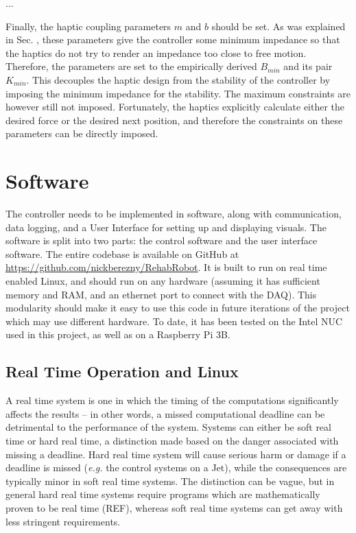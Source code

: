 \documentclass[12pt]{report}
\begin{document}
	...
	
	Finally, the haptic coupling parameters $m$ and $b$ should be set. As was explained in Sec. , these parameters give the controller some minimum impedance so that the haptics do not try to render an impedance too close to free motion. Therefore, the parameters are set to the empirically derived $B_{min}$ and its pair $K_{min}$. This decouples the haptic design from the stability of the controller by imposing the minimum impedance for the stability. The maximum constraints are however still not imposed. Fortunately, the haptics explicitly calculate either the desired force or the desired next position, and therefore the constraints on these parameters can be directly imposed. 
		

	
			
	\section{Software}	

	The controller needs to be implemented in software, along with communication, data logging, and a User Interface for setting up and displaying visuals. The software is split into two parts: the control software and the user interface software. The entire codebase is available on GitHub at \href{https://github.com/nickberezny/RehabRobot}{https://github.com/nickberezny/RehabRobot}. It is built to run on real time enabled Linux, and should run on any hardware (assuming it has sufficient memory and RAM, and an ethernet port to connect with the DAQ). This modularity should make it easy to use this code in future iterations of the project which may use different hardware. To date, it has been tested on the Intel NUC used in this project, as well as on a Raspberry Pi 3B. 
	

	

	\subsection{Real Time Operation and Linux}
	
%

A real time system is one in which the timing of the computations significantly affects the results \cite{Lewine1991} --  in other words, a missed computational deadline can be detrimental to the performance of the system. Systems can either be soft real time or hard real time, a distinction made based on the danger associated with missing a deadline. Hard real time system will cause serious harm or damage if a deadline is missed (\textit{e.g.} the control systems on a Jet), while the consequences are typically minor in soft real time systems. The distinction can be vague, but in general hard real time systems require programs which are mathematically proven to be real time (REF), whereas soft real time systems can get away with less stringent requirements. 
\end{document}
